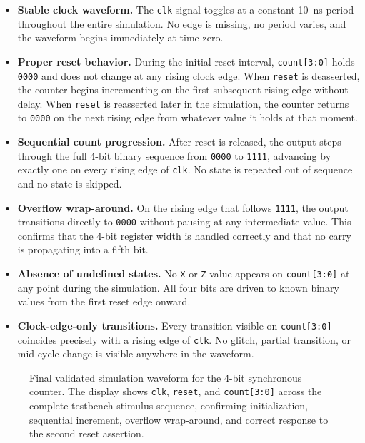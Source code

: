\begin{itemize}
\item \textbf{Stable clock waveform.} The \texttt{clk} signal toggles at a
	constant 10~ns period throughout the entire simulation. No edge is missing,
	no period varies, and the waveform begins immediately at time zero.

\item \textbf{Proper reset behavior.} During the initial reset interval,
	\texttt{count[3:0]} holds \texttt{0000} and does not change at any rising
	clock edge. When \texttt{reset} is deasserted, the counter begins
	incrementing on the first subsequent rising edge without delay. When
	\texttt{reset} is reasserted later in the simulation, the counter returns
	to \texttt{0000} on the next rising edge from whatever value it holds
	at that moment.

\item \textbf{Sequential count progression.} After reset is released, the
	output steps through the full 4-bit binary sequence from \texttt{0000}
	to \texttt{1111}, advancing by exactly one on every rising edge of
	\texttt{clk}. No state is repeated out of sequence and no state is
	skipped.

\item \textbf{Overflow wrap-around.} On the rising edge that follows
	\texttt{1111}, the output transitions directly to \texttt{0000} without
	pausing at any intermediate value. This confirms that the 4-bit register
	width is handled correctly and that no carry is propagating into a fifth bit.

\item \textbf{Absence of undefined states.} No \texttt{X} or \texttt{Z} value
	appears on \texttt{count[3:0]} at any point during the simulation. All four
	bits are driven to known binary values from the first reset edge onward.

\item \textbf{Clock-edge-only transitions.} Every transition visible on
	\texttt{count[3:0]} coincides precisely with a rising edge of \texttt{clk}.
	No glitch, partial transition, or mid-cycle change is visible anywhere in
	the waveform.
\end{itemize}

\begin{figure}[h]
\centering
\caption{Final validated simulation waveform for the 4-bit synchronous
         counter. The display shows \texttt{clk}, \texttt{reset}, and
         \texttt{count[3:0]} across the complete testbench stimulus sequence,
         confirming initialization, sequential increment, overflow wrap-around,
         and correct response to the second reset assertion.}
\label{fig:counter-final-waveform}
\end{figure}

